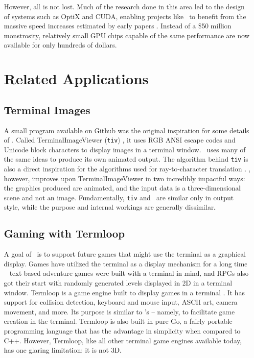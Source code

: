 However, all is not lost.
Much of the research done in this area led to the design of systems such as OptiX and CUDA, enabling projects like \name\ to benefit from the massive speed increases estimated by early papers \cite{parker2010optix, nvidia2011cuda, whitted2018explains}.
Instead of a \$50 million monstrosity, relatively small GPU chips capable of the same performance are now available for only hundreds of dollars.

\section{Related Applications}

\subsection{Terminal Images}

A small program available on Github was the original inspiration for some details of \name.
Called TerminalImageViewer (\texttt{tiv}) \cite{tivGithub}, it uses RGB ANSI escape codes and Unicode block characters to display images in a terminal window.
\name\ uses many of the same ideas to produce its own animated output.
The algorithm behind \texttt{tiv} is also a direct inspiration for the algorithms used for ray-to-character translation .
\name, however, improves upon TerminalImageViewer in two incredibly impactful ways: the graphics produced are animated, and the input data is a three-dimensional scene and not an image.
Fundamentally, \texttt{tiv} and \name\ are similar only in output style, while the purpose and internal workings are generally dissimilar.

\subsection{Gaming with Termloop}

A goal of \name\ is to support future games that might use the terminal as a graphical display.
Games have utilized the terminal as a display mechanism for a long time -- text based adventure games were built with a terminal in mind, and RPGs also got their start with randomly generated levels displayed in 2D in a terminal window.
Termloop is a game engine built to display games in a terminal \cite{termloop}.
It has support for collision detection, keyboard and mouse input, ASCII art, camera movement, and more.
Its purpose is similar to \name's -- namely, to facilitate game creation in the terminal.
Termloop is also built in pure Go, a fairly portable programming language that has the advantage in simplicity when compared to C++.
However, Termloop, like all other terminal game engines available today, has one glaring limitation: it is not 3D.

